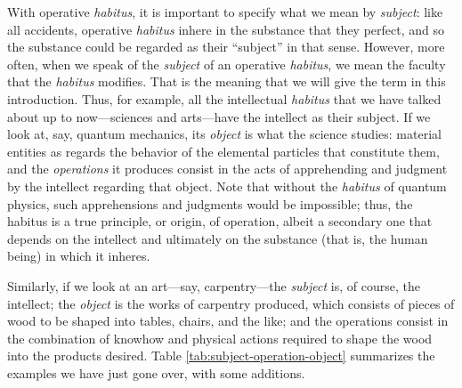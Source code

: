 \documentclass[article,12pt,a4paper,oneside]{memoir}
\begin{document}
    With operative \emph{habitus}, it is important to specify what we
    mean by \emph{subject}: like all accidents, operative \emph{habitus}
    inhere in the substance that they perfect, and so the substance
    could be regarded as their ``subject'' in that sense. However, more
    often, when we speak of the \emph{subject} of an operative
    \emph{habitus}, we mean the faculty that the \emph{habitus}
    modifies. That is the meaning that we will give the term in this
    introduction. Thus, for example, all the intellectual \emph{habitus}
    that we have talked about up to now---sciences and arts---have the
    intellect as their subject. If we look at, say, quantum mechanics,
    its \emph{object} is what the science studies: material entities as
    regards the behavior of the elemental particles that constitute
    them, and the \emph{operations} it produces consist in the acts of
    apprehending and judgment by the intellect regarding that object.
    Note that without the \emph{habitus} of quantum physics, such
    apprehensions and judgments would be impossible; thus, the habitus
    is a true principle, or origin, of operation, albeit a secondary one
    that depends on the intellect and ultimately on the substance (that
    is, the human being) in which it inheres.

    Similarly, if we look at an art---say, carpentry---the
    \emph{subject} is, of course, the intellect; the \emph{object} is
    the works of carpentry produced, which consists of pieces of wood to
    be shaped into tables, chairs, and the like; and the operations
    consist in the combination of knowhow and physical actions required
    to shape the wood into the products desired. Table
    \ref{tab:subject-operation-object} summarizes the examples we have
    just gone over, with some additions.
\end{document}
